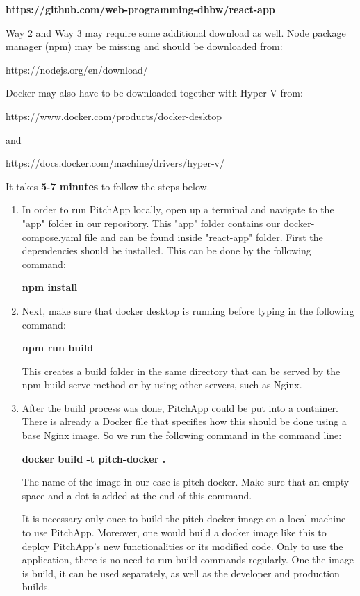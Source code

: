 \textbf{https://github.com/web-programming-dhbw/react-app}

Way 2 and Way 3 may require some additional download as well.
Node package manager (npm) may be missing and should be downloaded from:

https://nodejs.org/en/download/

Docker may also have to be downloaded together with Hyper-V from:

https://www.docker.com/products/docker-desktop

and

https://docs.docker.com/machine/drivers/hyper-v/

It takes \textbf{5-7 minutes} to follow the steps below.

\begin{enumerate}

\item In order to run PitchApp locally, open up a terminal and navigate to the "app" folder in our repository. This "app" folder contains our docker-compose.yaml file and can be found inside "react-app" folder. First the dependencies should be installed. This can be done by the following command:

\textbf{npm install}

\item Next, make sure that docker desktop is running before typing in the following command:

\textbf{npm run build}

This creates a build folder in the same directory that can be served by the npm build serve method or by using other servers, such as Nginx.

\item After the build process was done, PitchApp could be put into a container. There is already a Docker file that specifies how this should be done using a base Nginx image. So we run the following command in the command line:

\textbf{docker build -t pitch-docker .}

The name of the image in our case is pitch-docker. Make sure that an empty space and a dot is added at the end of this command.

It is necessary only once to build the pitch-docker image on a local machine to use PitchApp.
Moreover, one would build a docker image like this to deploy PitchApp's new functionalities or its modified code. Only to use the application, there is no need to run build commands regularly.
One the image is build, it can be used separately, as well as the developer and production builds.


\end{enumerate}

